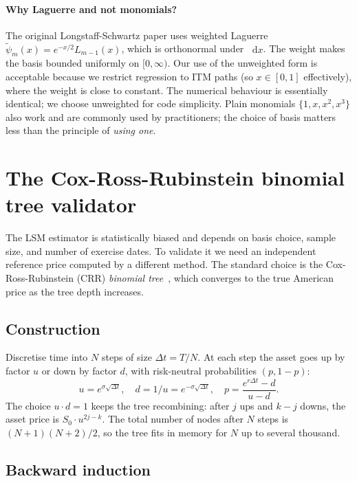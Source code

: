\documentclass[11pt,a4paper]{article}
\theoremstyle{plain}
\theoremstyle{definition}
\theoremstyle{remark}
\newcommand{\dd}{\mathop{}\!\mathrm{d}}
\begin{document}
\paragraph{Why Laguerre and not monomials?} The original
Longstaff-Schwartz paper uses weighted Laguerre $\tilde\psi_m(x) =
e^{-x/2} L_{m-1}(x)$, which is orthonormal under $\dd x$. The weight
makes the basis bounded uniformly on $[0, \infty)$. Our use of the
unweighted form is acceptable because we restrict regression to ITM
paths (so $x \in [0, 1]$ effectively), where the weight is close to
constant. The numerical behaviour is essentially identical; we choose
unweighted for code simplicity. Plain monomials $\{1, x, x^2, x^3\}$
also work and are commonly used by practitioners; the choice of basis
matters less than the principle of \emph{using one}.

\section{The Cox-Ross-Rubinstein binomial tree validator}
\label{sec:binomial}

The LSM estimator is statistically biased and depends on basis
choice, sample size, and number of exercise dates. To validate it we
need an independent reference price computed by a different method.
The standard choice is the Cox-Ross-Rubinstein (CRR)
\emph{binomial tree}~\cite{CRR1979}, which converges to the true
American price as the tree depth increases.

\subsection{Construction}

Discretise time into $N$ steps of size $\Delta t = T/N$. At each step
the asset goes up by factor $u$ or down by factor $d$, with
risk-neutral probabilities $(p, 1 - p)$:
\begin{equation}
u = e^{\sigma \sqrt{\Delta t}},
\quad
d = 1/u = e^{-\sigma \sqrt{\Delta t}},
\quad
p = \frac{e^{r \Delta t} - d}{u - d}.
\end{equation}
The choice $u \cdot d = 1$ keeps the tree recombining: after $j$ ups
and $k - j$ downs, the asset price is $S_0 \cdot u^{2j - k}$. The
total number of nodes after $N$ steps is $(N + 1)(N + 2)/2$, so the
tree fits in memory for $N$ up to several thousand.

\subsection{Backward induction}
\end{document}
